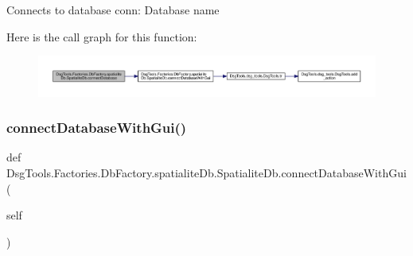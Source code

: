 \begin{DoxyVerb}Connects to database
conn: Database name
\end{DoxyVerb}
 Here is the call graph for this function\+:
\nopagebreak
\begin{figure}[H]
\begin{center}
\leavevmode
\includegraphics[width=350pt]{class_dsg_tools_1_1_factories_1_1_db_factory_1_1spatialite_db_1_1_spatialite_db_a681816e7af523d4799baea83afffec2b_cgraph}
\end{center}
\end{figure}
\mbox{\label{class_dsg_tools_1_1_factories_1_1_db_factory_1_1spatialite_db_1_1_spatialite_db_a8af5d99f30b1196ba398157b2e2d78dc}} 
\subsubsection{\texorpdfstring{connect\+Database\+With\+Gui()}{connectDatabaseWithGui()}}
{\footnotesize\ttfamily def Dsg\+Tools.\+Factories.\+Db\+Factory.\+spatialite\+Db.\+Spatialite\+Db.\+connect\+Database\+With\+Gui (\begin{DoxyParamCaption}\item[{}]{self }\end{DoxyParamCaption})}

